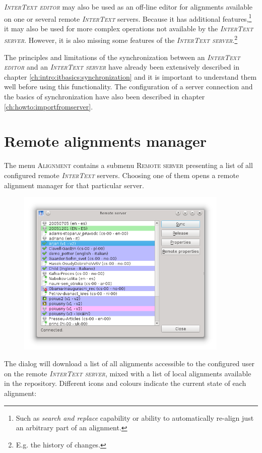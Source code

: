 \documentclass[a4paper,10pt,oneside]{book}
\newcommand{\IT}{\textit{\textsc{InterText}}\xspace}
\newcommand{\ITeditor}{\textit{\textsc{InterText editor}}\xspace}
\newcommand{\ITserver}{\textit{\textsc{InterText server}}\xspace}
\newcommand{\menu}[1]{\textsc{#1}}
\begin{document}
\ITeditor may also be used as an off-line editor for alignments available on one or several remote \IT servers. Because it has additional features,\footnote{Such as \emph{search and replace} capability or ability to automatically re-align just an arbitrary part of an alignment.} it may also be used for more complex operations not available by the \ITserver. However, it is also missing some features of the \ITserver.\footnote{E.g. the history of changes.}

The principles and limitations of the synchronization between an \ITeditor and an \ITserver have already been extensively described in chapter \ref{ch:intro:itbasics:synchronization} and it is important to understand them well before using this functionality. The configuration of a server connection and the basics of synchronization have also been described in chapter \ref{ch:howto:importfromserver}.

\section{Remote alignments manager}\label{ch:detail:managing_remote:manager}

The menu \menu{Alignment} contains a submenu \menu{Remote server} presenting a list of all configured remote \IT servers. Choosing one of them opens a remote alignment manager for that particular server.

\begin{figure}[htbf]
 \includegraphics[width=0.9\textwidth]{screenshots/remote_manager.png}
\end{figure}

The dialog will download a list of all alignments accessible to the configured user on the remote \ITserver, mixed with a list of local alignments available in the repository. Different icons and colours indicate the current state of each alignment:
\end{document}
